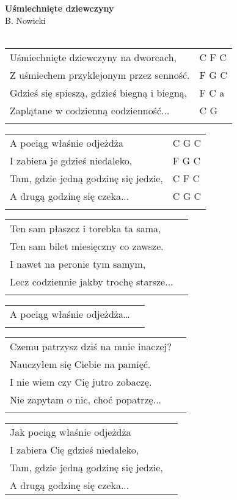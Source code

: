 \documentclass[a5paper]{article}
\begin{document}


\noindent
\fontsize{12pt}{15pt}\selectfont
\textbf{Uśmiechnięte dziewczyny} \\
\fontsize{8pt}{10pt}\selectfont
B. Nowicki \\ \\
\fontsize{10pt}{12pt}\selectfont
{}
\begin{tabular}{@{}p{8.00cm}p{3cm}@{}}
\noindent
Uśmiechnięte dziewczyny na dworcach, & C F C \\
Z uśmiechem przyklejonym przez senność. & F G C \\
Gdzieś się spieszą, gdzieś biegną i biegną, & F C a \\
Zaplątane w codzienną codzienność... & C G \\ \\
\end{tabular}

\noindent
\begin{tabular}{@{}p{7.00cm}p{3cm}@{}}
A pociąg właśnie odjeżdża & C G C \\
I zabiera je gdzieś niedaleko, & F G C \\
Tam, gdzie jedną godzinę się jedzie, & C F C \\
A drugą godzinę się czeka... & C G C \\ \\
\end{tabular}

\noindent
\begin{tabular}{@{}p{7.00cm}p{3cm}@{}}
Ten sam płaszcz i torebka ta sama, \\
Ten sam bilet miesięczny co zawsze. \\
I nawet na peronie tym samym, \\
Lecz codziennie jakby trochę starsze... \\ \\
\end{tabular}

\noindent
\begin{tabular}{@{}p{7.00cm}p{3cm}@{}}
A pociąg właśnie odjeżdża… \\ \\
\end{tabular}

\noindent
\begin{tabular}{@{}p{7.00cm}p{3cm}@{}}
Czemu patrzysz dziś na mnie inaczej? \\ 
Nauczyłem się Ciebie na pamięć.\\
I nie wiem czy Cię jutro zobaczę.\\
Nie zapytam o nic, choć popatrzę... \\ \\
\end{tabular}

\noindent
\begin{tabular}{@{}p{7.00cm}p{3cm}@{}}
Jak pociąg właśnie odjeżdża \\
I zabiera Cię gdzieś niedaleko, \\
Tam, gdzie jedną godzinę się jedzie,  \\
A drugą godzinę się czeka...
\end{tabular}
\end{document}
